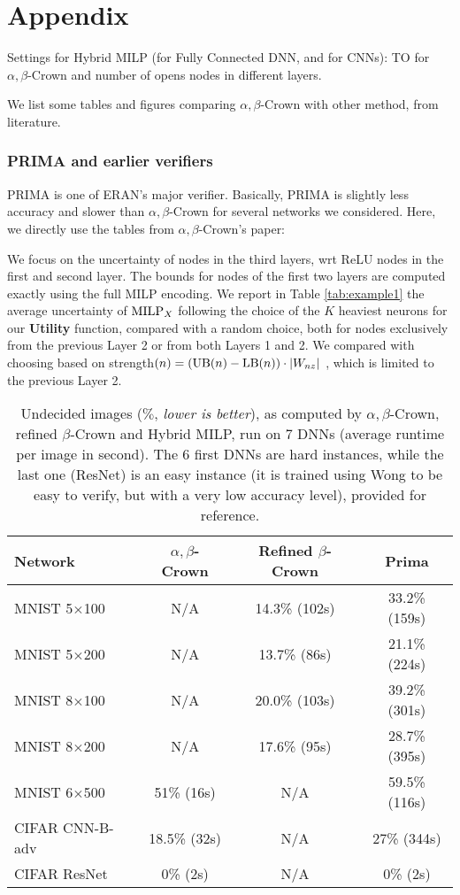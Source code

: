\section*{Appendix}

Settings for Hybrid MILP (for Fully Connected DNN, and for CNNs): TO for $\alpha,\beta$-Crown
and number of opens nodes in different layers.



We list some tables and figures comparing $\alpha,\beta$-Crown with other method, from literature.

\subsubsection*{PRIMA and earlier verifiers} 

PRIMA is one of ERAN's major verifier. Basically, PRIMA is slightly less accuracy and slower than $\alpha,\beta$-Crown for several networks we considered. Here, we directly use the tables from $\alpha,\beta$-Crown's paper:


We focus on the uncertainty of nodes in the third layers, wrt ReLU nodes in the first and second layer. The bounds for nodes of the first two layers are computed exactly using the full MILP encoding. We report in Table \ref{tab:example1} the average uncertainty of ${\textrm{MILP}}_X$ following the choice of the $K$ heaviest neurons for our {\bf Utility} function, compared with a random choice, both for nodes exclusively from the previous Layer 2 or from both Layers 1 and 2. We compared with choosing based on strength$(n) = (\mathrm{UB}(n)-\mathrm{LB}(n))\cdot |W_{nz}|$ \cite{DivideAndSlide}, which is limited to the previous Layer 2.


\begin{table}[h!]
	\centering
	\begin{tabular}{||l||c|c||c||}
		\hline \hline
		Network & $\alpha,\beta$-Crown & Refined $\beta$-Crown & Prima \\ 		  
		\hline
		MNIST 5$\times$100 & N/A & 14.3\% (102s) & 33.2\% (159s)\\ \hline
		MNIST 5$\times$200 & N/A & 13.7\% (86s) & 21.1\% (224s) \\ \hline
		MNIST 8$\times$100 & N/A & 20.0\% (103s) & 39.2\% (301s)   \\ \hline
		MNIST 8$\times$200 & N/A & 17.6\% (95s) & 28.7\% (395s)  \\ \hline
		MNIST 6$\times$500 & 51\% (16s) & N/A & 59.5\% (116s) \\ \hline
		CIFAR CNN-B-adv & 18.5\% (32s) & N/A & 27\% (344s)\\ \hline \hline
		CIFAR ResNet & 0\% (2s) & N/A & 0\% (2s) \\ \hline \hline
	\end{tabular}
	\caption{Undecided images ($\%$, {\em lower is better}), as computed by $\alpha,\beta$-Crown, refined $\beta$-Crown and Hybrid MILP, run on 7 DNNs (average runtime per image in second). The 6 first DNNs are hard instances, while the last one (ResNet) is an easy instance (it is trained using Wong to be easy to verify, but with a very low accuracy level), provided for reference.}
	\end{table}



